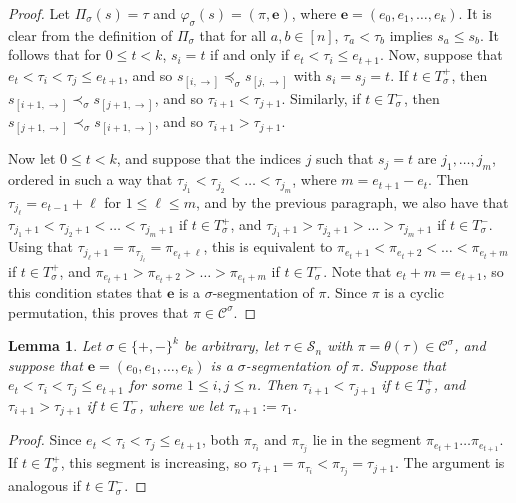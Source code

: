 \documentclass[12pt]{article}
\newcommand{\todo}[1]{\vspace{2 mm}\par\noindent
   \marginpar[\flushright\textsc{ToDo}]{\textsc{ToDo}}\framebox{\begin{minipage}[c]{\textwidth}
   \tt #1 \end{minipage}}\vspace{2 mm}\par}
\renewcommand{\S}{\mathcal{S}}
\newcommand{\C}{\mathcal{C}}
\newcommand{\e}{\mathbf{e}}
\theoremstyle{plain}
\newtheorem{lemma}[theorem]{Lemma}
\theoremstyle{definition}
\begin{document}
\begin{proof}
Let $\Pi_\sigma(s)=\tau$ and $\varphi_\sigma(s)=(\pi,\e)$, where $\e=(e_0,e_1,\ldots,e_k)$.  It is clear from the definition of $\Pi_\sigma$ that for all $a,b\in[n]$, $\tau_a<\tau_b$ implies $s_a\le s_b$. It follows that for $0\leq t<k$, $s_i=t$ if and only if $e_{t} < \tau_i\le e_{t+1}$. %
Now, suppose that $e_{t} < \tau_i<\tau_j\leq e_{t+1}$, and so $s_{[i, \rightarrow]} \preceq_\sigma s_{[j,\rightarrow]}$ with $s_i = s_j=t$.
If $t \in T^+_\sigma$, then $s_{[i+1, \rightarrow]} \prec_\sigma s_{[j+1,\rightarrow]}$, and so $\tau_{i+1}<\tau_{j+1}$.
Similarly, if $t \in T^-_\sigma$, then $s_{[j+1,\rightarrow]} \prec_\sigma s_{[i+1,\rightarrow]}$, and so $\tau_{i+1}>\tau_{j+1}$.

Now let $0\le t<k$, and suppose that the indices $j$ such that $s_j=t$ are $j_1,\dots, j_m$, ordered in such a way that $\tau_{j_1}< \tau_{j_2}<\dots< \tau_{j_m}$,
where $m=e_{t+1}-e_{t}$. Then $\tau_{j_\ell}=e_{t-1}+\ell$ for $1\le\ell\le m$,
and by the previous paragraph, we also have that $\tau_{j_1+1}< \tau_{j_2+1}<\dots< \tau_{j_m+1}$ if $t\in T^+_\sigma$,
and $\tau_{j_1+1}> \tau_{j_2+1}>\dots> \tau_{j_m+1}$ if $t\in T^-_\sigma$.
Using that $\tau_{j_\ell+1}=\pi_{\tau_{j_\ell}}=\pi_{e_{t}+\ell}$, this is equivalent to
$\pi_{e_{t}+1}< \pi_{e_{t}+2}<\dots<\pi_{e_{t}+m}$ if $t\in T^+_\sigma$,
and $\pi_{e_{t}+1}>\pi_{e_{t}+2}>\dots>\pi_{e_{t}+m}$ if $t\in T^-_\sigma$. Note that $e_{t}+m = e_{t+1}$, so this condition states that $\e$ is a $\sigma$-segmentation of $\pi$.
Since $\pi$ is a cyclic permutation, this proves that $\pi\in\C^\sigma$.
\end{proof}


\begin{lemma}\label{lem: Csigma}
Let $\sigma\in\{+,-\}^k$ be arbitrary, let $\tau\in\S_n$ with $\pi = \theta(\tau)\in \C^\sigma$, and suppose that
$\e=(e_0, e_1, \ldots, e_k)$ is a $\sigma$-segmentation of $\pi$.
Suppose that $e_{t} < \tau_i<\tau_j\leq e_{t+1}$ for some $1\leq i,j\leq n$. Then $\tau_{i+1}<\tau_{j+1}$ if $t \in T^+_\sigma$, and $\tau_{i+1}>\tau_{j+1}$ if $t \in T^-_\sigma$,
where we let $\tau_{n+1}:=\tau_1$.
\end{lemma}

\begin{proof}
Since $e_{t} < \tau_i<\tau_j\leq e_{t+1}$, both $\pi_{\tau_i}$ and $\pi_{\tau_j}$ lie in the segment $\pi_{e_{t}+1}\dots \pi_{e_{t+1}}$. If $t \in T^+_\sigma$, this segment is increasing,
so $\tau_{i+1}=\pi_{\tau_i}<\pi_{\tau_j}=\tau_{j+1}$. The argument is analogous if $t \in T^-_\sigma$.
\end{proof}
\end{document}
